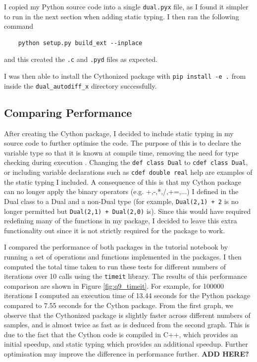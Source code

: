 \documentclass{article}
\begin{document}
I copied my Python source code into a single \texttt{dual.pyx} file, as I found it simpler to run in the next section when adding static typing. I then ran the following command
\begin{lstlisting}
    python setup.py build_ext --inplace
\end{lstlisting}
and this created the \texttt{.c} and \texttt{.pyd} files as expected. 

I was then able to install the Cythonized package with \texttt{pip install -e .} from inside the \texttt{dual\_autodiff\_x} directory successfully.

\subsection{ Comparing Performance }

After creating the Cython package, I decided to include static typing in my source code to further optimise the code. The purpose of this is to declare the variable type so that it is known at compile time, removing the need for type checking during execution \cite{research_computing_docs}. Changing the \texttt{def class Dual} to \texttt{cdef class Dual}, or including variable declarations such as \texttt{cdef double real} help are examples of the static typing I included. A consequence of this is that my Cython package can no longer apply the binary operators (e.g. +,-,*,/,+=,...) I defined in the Dual class to a Dual and a non-Dual type (for example, \texttt{Dual(2,1) + 2} is no longer permitted but \texttt{Dual(2,1) + Dual(2,0)} is). Since this would have required redefining many of the functions in my package, I decided to leave this extra functionality out since it is not strictly required for the package to work. 

I compared the performance of both packages in the tutorial notebook by running a set of operations and functions implemented in the packages. I then computed the total time taken to run these tests for different numbers of iterations over 10 calls using the \texttt{timeit} library. The results of this performance comparison are shown in Figure \ref{fig:q9_timeit}. For example, for 100000 iterations I computed an execution time of 13.44 seconds for the Python package compared to 7.55 seconds for the Cython package. From the first graph, we observe that the Cythonized package is slightly faster across different numbers of samples, and is almost twice as fast as is deduced from the second graph. This is due to the fact that the Cython code is compiled in C++, which provides an initial speedup, and static typing which provides an additional speedup. Further optimisation may improve the difference in performance further. \textbf{ADD HERE?}
\end{document}
